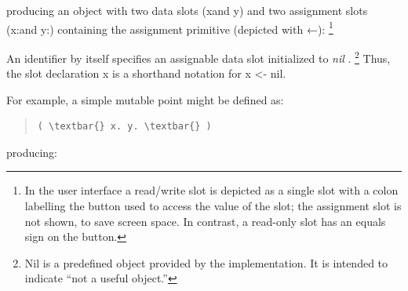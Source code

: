 \documentclass[letterpaper,10pt,english]{sphinxmanual}
\begin{document}
producing an object with two data slots (xand y) and two assignment slots (x:and y:) containing the assignment primitive (depicted with ←): \footnote{
In the user interface a read/write slot is depicted as a single slot with a colon labelling the button used to access the value of the slot; the assignment slot is not shown, to save screen space. In contrast, a read-only slot has an equals sign on the button.
}
\begin{figure}[htbp]\begin{flushleft}

\end{flushleft}\end{figure}

An identifier by itself specifies an assignable data slot initialized to \emph{nil} . \footnote{
Nil is a predefined object provided by the implementation. It is intended to indicate “not a useful object.”
} Thus, the slot declaration x is a shorthand notation for x \textless{}- nil.

For example, a simple mutable point might be defined as:
\begin{quote}

\begin{Verbatim}[commandchars=\\\{\}]
( \textbar{} x. y. \textbar{} )
\end{Verbatim}
\end{quote}

producing:
\begin{figure}[htbp]\begin{flushleft}

\end{flushleft}\end{figure}
\end{document}
